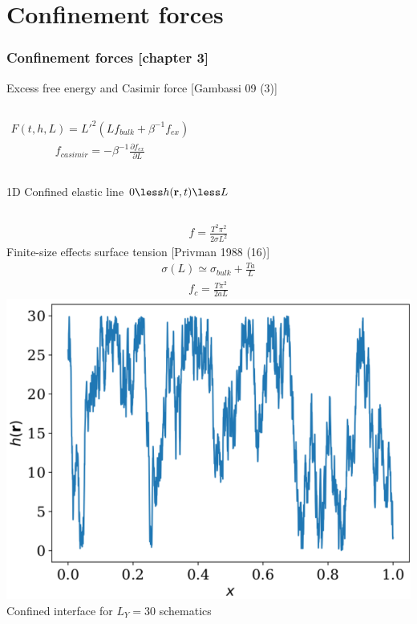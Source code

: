 \documentclass[9pt, dvipsnames]{beamer} %
\newcommand{\br}{{\bf r}}
\begin{document}
\section{Confinement forces}

\begin{frame}
    \frametitle{Confinement forces [chapter 3]}
    \begin{block}{Excess free energy and Casimir force [Gambassi 09 (3)]}
    \begin{columns}
		\begin{align}
		F(t,h,L) = L'^2 \left( L f_{bulk} + \beta^{-1} f_{ex} \right)
		\end{align}
		\begin{align}
		 f_{casimir} = - \beta^{-1} \frac{\partial  f_{ex}}{\partial L}
		\end{align}
    \end{columns}
    \end{block}
    \begin{block}{1D Confined elastic line  $0 \less h(\br,t) \less L$}
	\begin{columns}
	    \begin{align}
		   f = \frac{T^2\pi^2}{2\sigma L^2} 
	    \end{align}
	    Finite-size effects surface tension [Privman 1988 (16)] 
	    \begin{align}
	    	\sigma(L) \simeq \sigma_{bulk}+\frac{Ta}{L}
    	\end{align}
	    \begin{align}
	        f_c= \frac{T\pi^2}{2 a L} 
	    \end{align}
	    \includegraphics[width=\linewidth]{interface-confined.pdf}
	    {\footnotesize Confined interface for $L_Y=30$ schematics}
	    \end{columns}
	\end{block}
\end{frame}
\end{document}
